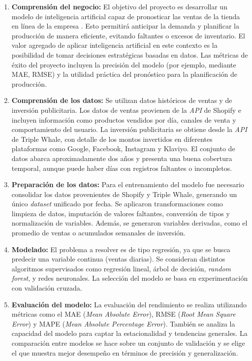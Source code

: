 \documentclass[
11pt, %
]{charter}
\begin{document}
\begin{enumerate}
  \item \textbf{Comprensión del negocio:}  
  El objetivo del proyecto es desarrollar un modelo de inteligencia artificial capaz de pronosticar las ventas de la tienda en línea de la empresa \empclientename. Esto permitirá anticipar la demanda y planificar la producción de manera eficiente, evitando faltantes o excesos de inventario. El valor agregado de aplicar inteligencia artificial en este contexto es la posibilidad de tomar decisiones estratégicas basadas en datos. Las métricas de éxito del proyecto incluyen la precisión del modelo (por ejemplo, mediante MAE, RMSE) y la utilidad práctica del pronóstico para la planificación de producción.

  \item \textbf{Comprensión de los datos:}  
  Se utilizan datos históricos de ventas y de inversión publicitaria. Los datos de ventas provienen de la \textit{API} de Shopify e incluyen información como productos vendidos por día, canales de venta y comportamiento del usuario. La inversión publicitaria se obtiene desde la \textit{API} de Triple Whale, con detalle de los montos invertidos en diferentes plataformas como Google, Facebook, Instagram y Klaviyo. El conjunto de datos abarca aproximadamente dos años y presenta una buena cobertura temporal, aunque puede haber días con registros faltantes o incompletos.

  \item \textbf{Preparación de los datos:}  
  Para el entrenamiento del modelo fue necesario consolidar los datos provenientes de Shopify y Triple Whale, generando un único \textit{dataset} unificado por fecha. Se aplicaron transformaciones como limpieza de datos, imputación de valores faltantes, conversión de tipos y normalización de variables. Además, se generaron variables derivadas, como el promedio de ventas o acumulados semanales de inversión.

  \item \textbf{Modelado:}  
  El problema a resolver es de tipo regresión, ya que se busca predecir una variable continua (ventas diarias). Se consideran distintos algoritmos supervisados como regresión lineal, árbol de decisión, \textit{random forest}, y redes neuronales. La selección del modelo se basa en experimentación con validación cruzada.

  \item \textbf{Evaluación del modelo:}  
  La evaluación del rendimiento se realiza utilizando métricas como el MAE (\textit{Mean Absolute Error}), RMSE (\textit{Root Mean Square Error}) y MAPE (\textit{Mean Absolute Percentage Error}). También se analiza la capacidad del modelo para captar la estacionalidad y tendencias generales. La comparación entre modelos se hace sobre un conjunto de validación y se elige el que muestra mejor desempeño en términos de precisión y generalización.


\end{enumerate}
\end{document}

